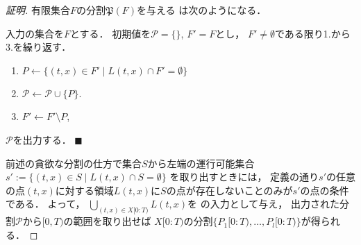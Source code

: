 \begin{proof}[証明]
有限集合$F$の分割$\mathfrak{P}(F)$を与える
{\setPartitionAlgorithm}は次のようになる．

\begin{setPartitionAlgorithmForTimeSpecifiedProblemOnLine}
入力の集合を$F$とする．
初期値を$\mathcal{P} = \{\}$, $F' = F$とし，
$F' \neq \emptyset$である限り1.から3.を繰り返す．
\begin{enumerate}
\item $P \gets \{ (t, x) \in F' \mid L(t, x) \cap F' = \emptyset \}$
\item $\mathcal{P} \gets \mathcal{P} \cup \{ P \}$.
\item $F' \gets F' \setminus P$, 
\end{enumerate}
$\mathcal{P}$を出力する．
$\blacksquare$
\end{setPartitionAlgorithmForTimeSpecifiedProblemOnLine}

前述の貪欲な分割の仕方で集合$S$から左端の運行可能集合
$s' := \{ (t, x) \in S \mid L(t, x) \cap S = \emptyset \}$
を取り出すときには，
定義の通り$s'$の任意の点$(t, x)$に対する領域$L(t, x)$に$S$の点が存在しないことのみが$s'$の点の条件である．
よって，
$\bigcup_{(t, x) \in X[0:T)} L(t, x)$を
{\setPartitionAlgorithm}の入力として与え，
出力された分割$\mathcal{P}$から$[0, T)$の範囲を取り出せば
$X[0:T)$の分割$\{ P_1[0:T), \ldots, P_l[0:T) \}$が得られる．
\end{proof}
